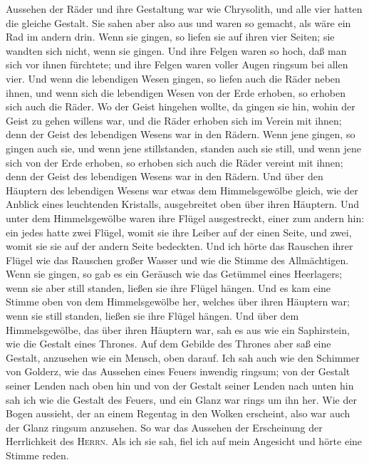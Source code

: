 Aussehen der Räder und ihre Gestaltung war wie Chrysolith, und alle vier
hatten die gleiche Gestalt. Sie sahen aber also aus und waren so
gemacht, als wäre ein Rad im andern drin.  Wenn sie
gingen, so liefen sie auf ihren vier Seiten; sie wandten sich nicht,
wenn sie gingen.  Und ihre Felgen waren so hoch, daß man
sich vor ihnen fürchtete; und ihre Felgen waren voller Augen ringsum bei
allen vier.  Und wenn die lebendigen Wesen gingen, so
liefen auch die Räder neben ihnen, und wenn sich die lebendigen Wesen
von der Erde erhoben, so erhoben sich auch die Räder.  Wo
der Geist hingehen wollte, da gingen sie hin, wohin der Geist zu gehen
willens war, und die Räder erhoben sich im Verein mit ihnen; denn der
Geist des lebendigen Wesens war in den Rädern.  Wenn jene
gingen, so gingen auch sie, und wenn jene stillstanden, standen auch sie
still, und wenn jene sich von der Erde erhoben, so erhoben sich auch die
Räder vereint mit ihnen; denn der Geist des lebendigen Wesens war in den
Rädern.  Und über den Häuptern des lebendigen Wesens war
etwas dem Himmelsgewölbe gleich, wie der Anblick eines leuchtenden
Kristalls, ausgebreitet oben über ihren Häuptern.  Und
unter dem Himmelsgewölbe waren ihre Flügel ausgestreckt, einer zum
andern hin: ein jedes hatte zwei Flügel, womit sie ihre Leiber auf der
einen Seite, und zwei, womit sie sie auf der andern Seite bedeckten.
 Und ich hörte das Rauschen ihrer Flügel wie das Rauschen
großer Wasser und wie die Stimme des Allmächtigen. Wenn sie gingen, so
gab es ein Geräusch wie das Getümmel eines Heerlagers; wenn sie aber
still standen, ließen sie ihre Flügel hängen.  Und es kam
eine Stimme oben von dem Himmelsgewölbe her, welches über ihren Häuptern
war; wenn sie still standen, ließen sie ihre Flügel hängen.
 Und über dem Himmelsgewölbe, das über ihren Häuptern
war, sah es aus wie ein Saphirstein, wie die Gestalt eines Thrones. Auf
dem Gebilde des Thrones aber saß eine Gestalt, anzusehen wie ein Mensch,
oben darauf.  Ich sah auch wie den Schimmer von Golderz,
wie das Aussehen eines Feuers inwendig ringsum; von der Gestalt seiner
Lenden nach oben hin und von der Gestalt seiner Lenden nach unten hin
sah ich wie die Gestalt des Feuers, und ein Glanz war rings um ihn her.
 Wie der Bogen aussieht, der an einem Regentag in den
Wolken erscheint, also war auch der Glanz ringsum anzusehen. So war das
Aussehen der Erscheinung der Herrlichkeit des \textsc{Herrn}. Als ich
sie sah, fiel ich auf mein Angesicht und hörte eine Stimme reden.

